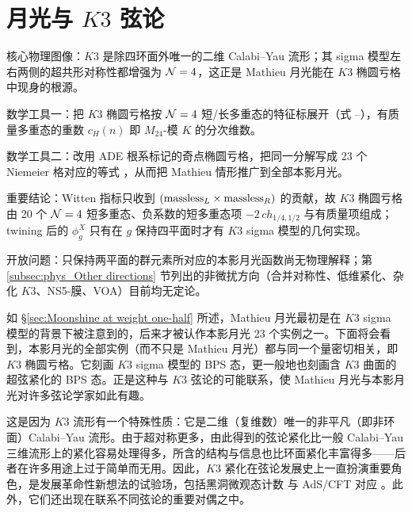 \section{月光与 $K3$ 弦论}
\label{chap:moonshineK3}

\begin{keytakeaways}
  \item 核心物理图像：$K3$ 是除四环面外唯一的二维 Calabi--Yau 流形；其 sigma 模型左右两侧的超共形对称性都增强为 ${\cal N}=4$，这正是 Mathieu 月光能在 $K3$ 椭圆亏格中现身的根源。
  \item 数学工具一：把 $K3$ 椭圆亏格按 ${\cal N}=4$ 短/长多重态的特征标展开（式 --），有质量多重态的重数 $c_H(n)$ 即 $M_{24}$-模 $K$ 的分次维数。
  \item 数学工具二：改用 ADE 根系标记的奇点椭圆亏格，把同一分解写成 23 个 Niemeier 格对应的等式 ，从而把 Mathieu 情形推广到全部本影月光。
  \item 重要结论：Witten 指标只收到 $({\rm massless}_L\times{\rm massless}_R)$ 的贡献，故 $K3$ 椭圆亏格由 20 个 ${\cal N}=4$ 短多重态、负系数的短多重态项 $-2\,ch_{1/4,1/2}$ 与有质量项组成；twining 后的 $\phi_g^X$ 只有在 $g$ 保持四平面时才有 $K3$ sigma 模型的几何实现。
  \item 开放问题：只保持两平面的群元素所对应的本影月光函数尚无物理解释；第 \ref{subsec:phys_Other directions} 节列出的非微扰方向（合并对称性、低维紧化、杂化 $K3$、NS5-膜、VOA）目前均无定论。
\end{keytakeaways}

如 \S\ref{sec:Moonshine at weight one-half} 所述，Mathieu 月光最初是在 $K3$ sigma 模型的背景下被注意到的，后来才被认作本影月光 23 个实例之一。下面将会看到，本影月光的全部实例（而不只是 Mathieu 月光）都与同一个量密切相关，即 $K3$ 椭圆亏格。它刻画 $K3$ sigma 模型的 BPS 态，更一般地也刻画含 $K3$ 曲面的超弦紧化的 BPS 态。正是这种与 $K3$ 弦论的可能联系，使 Mathieu 月光与本影月光对许多弦论学家如此有趣。


这是因为 $K3$ 流形有一个特殊性质：它是二维（复维数）唯一的非平凡（即非环面）Calabi--Yau 流形。由于超对称更多，由此得到的弦论紧化比一般 Calabi--Yau 三维流形上的紧化容易处理得多，所含的结构与信息也比环面紧化丰富得多——后者在许多用途上过于简单而无用。因此，$K3$ 紧化在弦论发展史上一直扮演重要角色，是发展革命性新想法的试验场，包括黑洞微观态计数 \cite{StromingerPhys.Lett.B379:99-1041996} 与 AdS/CFT 对应 \cite{MaldacenaAdv.Theor.Math.Phys.2:231-2521998}。此外，它们还出现在联系不同弦论的重要对偶之中。

